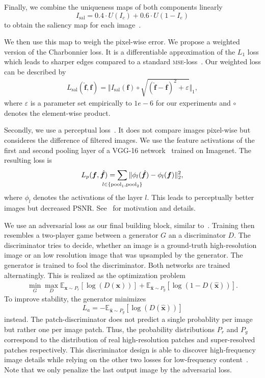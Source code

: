 \documentclass{scrartcl}
\newcommand{\img}{\bm{f}} %
\begin{document}
Finally, we combine the uniqueness maps of both components linearly
\begin{equation}
  \label{eq:saliency}
  I_{\text{sal}} = 0.4 \cdot U(I_c) + 0.6 \cdot U(1 - I_e)
\end{equation}
to obtain the saliency map for each image~\cite{SaliencyGAN}.

We then use this map to weigh the pixel-wise error.
We propose a weighted version of the Charbonnier loss.
It is a differentiable approximation of the $L_1$ loss which leads to sharper edges compared to a standard \textsc{mse}-loss~\cite{LapSRN}.
Our weighted loss can be described by
\begin{align}
\label{eq:charbonnier}
  L_{\text{sal}}( \hat{\bm{\img}}, \bm{\img}) = \Vert I_{\text{sal}}(\img) \circ \sqrt{ (\hat{\img} - \img)^2 + \varepsilon} \Vert_1,
\end{align}
where $\varepsilon$ is a parameter set empirically to $1e-6$ for our experiments and \(\circ\) denotes the element-wise product.

Secondly, we use a perceptual loss~\cite{PerceptualLoss}.
It does not compare images pixel-wise but consideres the difference of filtered images.
We use the feature activations of the first and second pooling layer of a VGG-16 network~\cite{Vgg} trained on Imagenet.
The resulting loss is
\begin{equation}
  \label{eq:perceptual-loss}
  L_p(\img, \hat{\img}) = \sum_{\mathclap{l \in \{ \text{pool}_1, \text{pool}_2 \}}} \Vert \phi_l( \hat{\img} ) - \phi_l (\img) \Vert_2^2,
\end{equation}
where \(\phi_l\) denotes the activations of the layer \(l\).
This leads to perceptually better images but decreased PSNR.
See~\cite{PerceptualLoss} for motivation and details.

We use an adversarial loss as our final building block, similar to~\cite{SRGAN}.
Training then resembles a two-player game between a generator \(G\) an a discriminator \(D\).
The discriminator tries to decide, whether an image is a ground-truth high-resolution image or an low resolution image that was upsampled by the generator.
The generator is trained to fool the discriminator.
Both networks are trained alternatingly.
This is realized as the optimization problem~\cite{GAN}
\begin{align}
 \min_G \max_D \mathbb{E}_{\bm{x} \sim P_r} \left[ \log (D({\bm{x}})) \right] +
  \mathbb{E}_{\hat{\bm{x}} \sim P_g} \left[  \log (1 - D(\hat{\bm{x}})) \right].
\end{align}
To improve stability, the generator minimizes
\begin{equation}
  L_a = - \mathbb{E}_{\hat{\bm{x}} \sim P_g} \left[ \log (D(\hat{\bm{x}})) \right]
\end{equation}
instead.
The patch-discriminator does not predict a single probablity per image but rather one per image patch.
Thus, the probability distributions $P_r$ and $P_g$ correspond to the distribution of real high-resolution patches and super-resolved patches respectively.
This discriminator design is able to discover high-frequency image details while relying on the other two losses for low-frequency content~\cite{PatchGAN}.
Note that we only penalize the last output image by the adversarial loss.
\end{document}
